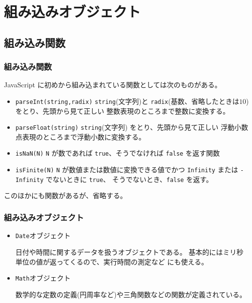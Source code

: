 \section{組み込みオブジェクト}
\subsection{組み込み関数}
\begin{frame}[containsverbatim]
 \frametitle{組み込み関数}
JavaScript に初めから組み込まれている関数としては次のものがある。
\begin{itemize}
 \item \Verb+parseInt(string,radix)+ \Verb+string+(文字列)と
       \Verb+radix+(基数、省略したときは$10$)をとり、先頭から見て正しい
       整数表現のところまで整数に変換する。
 \item \Verb+parseFloat(string)+ \Verb+string+(文字列)
       をとり、先頭から見て正しい
       浮動小数点表現のところまで浮動小数に変換する。
 \item \Verb+isNaN(N)+ \Verb+N+ が数であれば \Verb+true+、そうでなければ
       \Verb+false+ を返す関数
 \item \Verb+isFinite(N)+ \Verb+N+ が数値または数値に変換できる値でかつ
       \Verb+Infinity+ または \Verb+-Infinity+ でないときに \Verb+true+、
       そうでないとき、\Verb+false+ を返す。
\end{itemize}
このほかにも関数があるが、省略する。
\end{frame}

\begin{frame}[containsverbatim]
 \frametitle{組み込みオブジェクト}
\begin{itemize}
 \item \texttt{Date}オブジェクト

日付や時間に関するデータを扱うオブジェクトである。
基本的にはミリ秒単位の値が返ってくるので、実行時間の測定など
にも使える。
 \item {\texttt{Math}オブジェクト}

数学的な定数の定義(円周率など)や三角関数などの関数が定義されている。
\end{itemize}

\end{frame}



